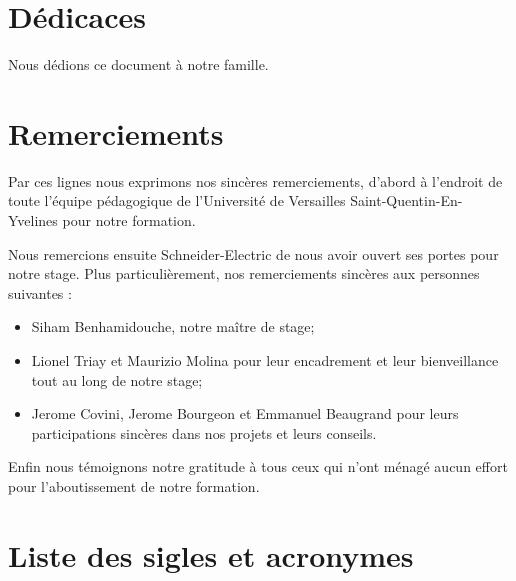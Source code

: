\documentclass[a4paper,12pt]{book}
\theoremstyle{break}
\begin{document}

\frontmatter
\chapter*{Dédicaces}
Nous dédions ce document à notre famille.
\chapter*{Remerciements}
Par ces lignes nous exprimons nos sincères remerciements, d’abord à l’endroit de toute l’équipe pédagogique de l'Université de Versailles Saint-Quentin-En-Yvelines pour notre formation.


Nous remercions ensuite Schneider-Electric de nous avoir ouvert ses portes pour notre stage.
Plus particulièrement, nos remerciements sincères aux personnes suivantes :
\begin{itemize}
    \item Siham Benhamidouche, notre maître de stage;
    \item Lionel Triay et Maurizio Molina pour leur encadrement et leur bienveillance tout au long de notre stage;
    \item Jerome Covini, Jerome Bourgeon et Emmanuel Beaugrand pour leurs participations sincères dans nos projets et leurs conseils.
\end{itemize} 

Enfin nous témoignons notre gratitude à tous ceux qui n’ont ménagé aucun effort pour l’aboutissement de notre formation. 

\clearpage
\tableofcontents

\clearpage
\listoffigures

\clearpage
\chapter*{Liste des sigles et acronymes}
\begin{acronym}[CP-OFDMX] %
\end{acronym}
\end{document}
